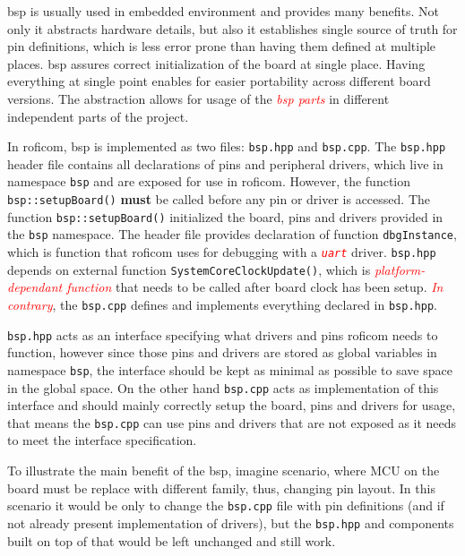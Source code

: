 \documentclass[
  digital,     %
  oneside,     %
  nosansbold,  %
  nocolorbold, %
  lof,         %
  lot,         %
]{fithesis4}
\newcommand{\TODO}[1]{\textcolor{red}{\textit{#1}}}
\begin{document}
{{{\acrshort{bsp} is usually used in embedded environment and provides many benefits. Not only it abstracts hardware details, but also it establishes single source of truth for pin definitions, which is less error prone than having them defined at multiple places. \acrshort{bsp} assures correct initialization of the board at single place. Having everything at single point enables for easier portability across different board versions. The abstraction allows for usage of the \TODO{bsp parts} in different independent parts of the project. 

In \acrshort{roficom}, \acrshort{bsp} is implemented as two files: \verb|bsp.hpp| and \verb|bsp.cpp|. The \verb|bsp.hpp| header file contains all declarations of pins and peripheral drivers, which live in namespace \lstinline{bsp} and are exposed for use in \acrshort{roficom}. However, the function \lstinline{bsp::setupBoard()} \textbf{must} be called before any pin or driver is accessed. The function \lstinline{bsp::setupBoard()} initialized the board, pins and drivers provided in the \lstinline{bsp} namespace. The header file provides declaration of function \lstinline{dbgInstance}, which is function that \acrshort{roficom} uses for debugging with a \TODO{ \texttt{uart} } driver. \verb|bsp.hpp| depends on external function \lstinline|SystemCoreClockUpdate()|, which is \TODO{platform-dependant function} that needs to be called after board clock has been setup. \TODO{In contrary}, the \verb|bsp.cpp| defines and implements everything declared in \verb|bsp.hpp|. 

\verb|bsp.hpp| acts as an interface specifying what drivers and pins \acrshort{roficom} needs to function, however since those pins and drivers are stored as global variables in namespace \lstinline{bsp}, the interface should be kept as minimal as possible to save space in the global space. On the other hand \verb|bsp.cpp| acts as implementation of this interface and should mainly correctly setup the board, pins and drivers for usage, that means the \verb|bsp.cpp| can use pins and drivers that are not exposed as it needs to meet the interface specification.

To illustrate the main benefit of the \acrshort{bsp}, imagine scenario, where MCU on the board must be replace with different family, thus, changing pin layout. In this scenario it would be only to change the \verb|bsp.cpp| file with pin definitions (and if not already present implementation of drivers), but the \verb|bsp.hpp| and components built on top of that would be left unchanged and still work.

}}}
\end{document}
